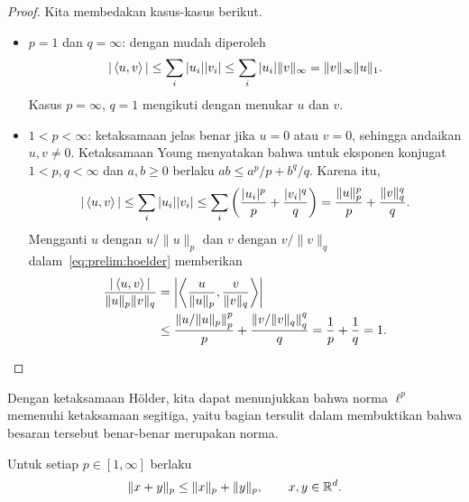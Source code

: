 \begin{proof}
    Kita membedakan kasus-kasus berikut.
    \begin{itemize}
        \item $p=1$ dan $q=\infty$: dengan mudah diperoleh
        \begin{equation}
            |\left\langle u , v\right\rangle|
            \leq\sum_i|u_i||v_i|
            \leq\sum_i|u_i|\|v\|_\infty
            =\|v\|_\infty\|u\|_1.
        \end{equation}
        Kasus $p=\infty$, $q=1$ mengikuti dengan menukar $u$ dan $v$.

        \item $1<p<\infty$: ketaksamaan jelas benar jika $u=0$ atau $v=0$,
        sehingga andaikan $u,v\neq0$. Ketaksamaan Young menyatakan bahwa untuk
        eksponen konjugat $1<p,q<\infty$ dan $a,b\geq0$ berlaku
        $ab\leq a^p/p+b^q/q$. Karena itu,
        \begin{equation}\label{eq:prelim:hoelder}
            |\left\langle u , v\right\rangle|
            \leq\sum_i|u_i||v_i|
            \leq\sum_i\left(\frac{|u_i|^p}{p}+\frac{|v_i|^q}{q}\right)
            =\frac{\|u\|_p^p}{p}+\frac{\|v\|_q^q}{q}.
        \end{equation}
        Mengganti $u$ dengan $u/\|u\|_p$ dan $v$ dengan $v/\|v\|_q$
        dalam~\eqref{eq:prelim:hoelder} memberikan
        \begin{equation}
            \begin{aligned}
                \frac{|\left\langle u , v\right\rangle|}{\|u\|_p\|v\|_q}
                &=\left|\left\langle\frac{u}{\|u\|_p} , \frac{v}{\|v\|_q}\right\rangle\right|\\
                &\leq
                \frac{\left\|u/\|u\|_p\right\|_p^p}{p}
                +\frac{\left\|v/\|v\|_q\right\|_q^q}{q}
                =\frac1p+\frac1q=1.
            \end{aligned}
        \end{equation}
    \end{itemize}
\end{proof}

Dengan ketaksamaan Hölder, kita dapat menunjukkan bahwa norma $\ell^p$
memenuhi ketaksamaan segitiga, yaitu bagian tersulit dalam membuktikan bahwa
besaran tersebut benar-benar merupakan norma.

\begin{theorem}
    Untuk setiap $p\in[1,\infty]$ berlaku
    \begin{equation}
        \|x+y\|_p\leq\|x\|_p+\|y\|_p,
        \qquad x,y\in\mathbb{R}^d.
    \end{equation}
\end{theorem}


